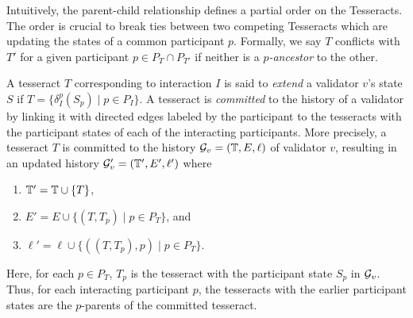 Intuitively, the parent-child relationship defines a partial order on the Tesseracts. The order is crucial to break ties between two competing Tesseracts which are updating the states of a common participant $p$. Formally, we say $T$ conflicts with $T'$ for a given participant $p \in P_T \cap P_{T'}$ if neither is a \textit{$p$-ancestor} to the other.




A tesseract $T$ corresponding to interaction $I$ is said to \emph{extend} a validator $v$'s state $S$ if $T=\{\delta_I^p(S_p)\mid p\in P_I\}$.
A tesseract is \emph{committed} to the history of a validator by linking it with directed edges labeled by the participant to the tesseracts with the participant states of each of the interacting participants. 
More precisely, a tesseract $T$ is committed to the history $\mathcal{G}_v=(\mathbb{T}, E, \ell)$ of validator $v$, resulting in an updated history $\mathcal{G}'_v=(\mathbb{T}', E', \ell')$ where %
\begin{enumerate}
    \item  $\mathbb{T}'=\mathbb{T}\cup \{T\}$, 
    \item  $E' = E\cup \{(T, T_p)\mid p\in P_T\}$, and
    \item $\ell'=\ell\cup\{((T,T_p), p)\mid p\in P_T\}$.
\end{enumerate}
Here, for each $p\in P_T$, $T_p$ is the tesseract with the participant state $S_p$ in $\mathcal{G}_v$. 
Thus, for each interacting participant $p$, the tesseracts with the earlier participant states are the $p$-parents of the committed tesseract. 



